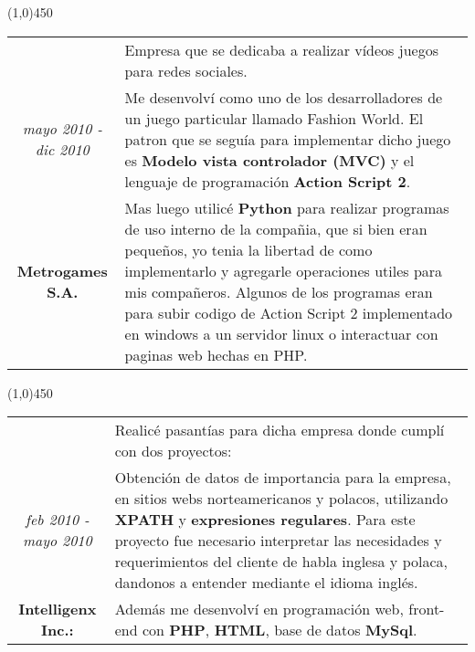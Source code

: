 \begin{center}
\line(1,0){450}
\end{center}
\noindent
\begin{tabular}{c|p{12.5cm}}
& \large Empresa que se dedicaba a realizar vídeos juegos para redes sociales.\\
\large\textit{mayo 2010 - dic 2010} &  \large Me desenvolví como uno de los desarrolladores de un juego particular llamado Fashion World. El patron que se seguía para implementar dicho juego es \textbf{Modelo vista controlador (MVC)} y el lenguaje de programación \textbf{Action Script 2}.\\
\large\textbf{Metrogames S.A.} & \large Mas luego utilicé \textbf{Python} para realizar programas de uso interno de la compañia, que si bien eran pequeños, yo tenia la libertad de como implementarlo y agregarle operaciones utiles para mis compañeros. Algunos de los programas eran para subir codigo de Action Script 2 implementado en windows a un servidor linux o interactuar con paginas web hechas en PHP.
\end{tabular}

\begin{center}
\line(1,0){450}
\end{center}
\noindent
\begin{tabular}{c|p{12.5cm}}
& \large Realicé pasantías para dicha empresa donde cumplí con dos proyectos:\\
\large\textit{feb 2010 - mayo 2010} & \large Obtención de datos de importancia para la empresa, en sitios webs norteamericanos y polacos, utilizando \textbf{XPATH} y \textbf{expresiones regulares}.  Para este proyecto fue necesario interpretar las necesidades y requerimientos del cliente de habla inglesa y polaca, dandonos a entender mediante el idioma inglés.\\
\large\textbf{Intelligenx Inc.:} & \large Además me desenvolví en programación web, front-end con \textbf{PHP}, \textbf{HTML}, base de datos \textbf{MySql}.
\end{tabular}

